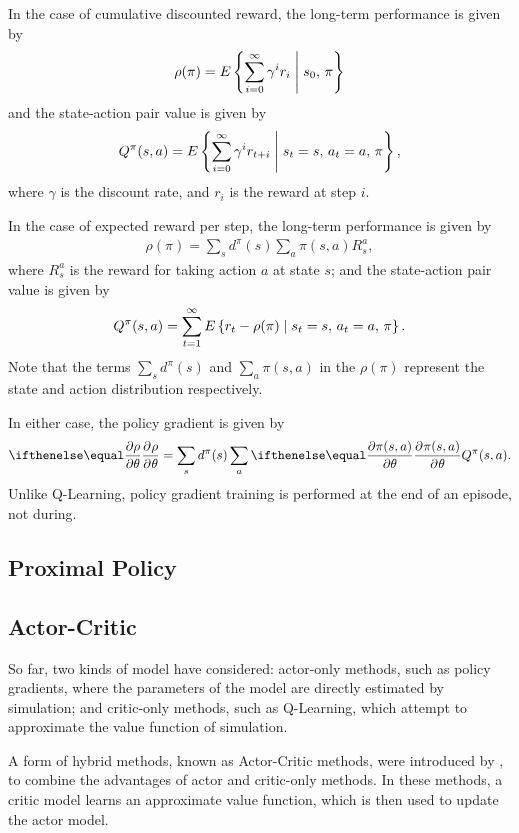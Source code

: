 In the case of cumulative discounted reward, the long-term performance is given
by
\begin{align*}
    \rho(\pi) = E\left\{ \sum_{i=0}^{\infty} \gamma^{i}r_{i}
    \;\middle|\; s_0,\, \pi \right\}
\end{align*}
and the state-action pair value is given by
\begin{align*}
    Q^\pi(s,a) = E\left\{ \sum_{i=0}^{\infty} \gamma^{i}r_{t+i}
    \;\middle|\; s_t=s,\, a_t=a,\, \pi \right\},
\end{align*}
where $\gamma$ is the discount rate, and $r_i$ is the reward at step $i$.

In the case of expected reward per step, the long-term performance is given by
\begin{align*}
    \rho(\pi) = \sum_s d^\pi(s) \sum_a \pi(s,a) R_s^a,
\end{align*}
where $R_s^a$ is the reward for taking action $a$ at state $s$;
and the state-action pair value is given by
\begin{align*}
    Q^\pi(s,a) = \sum_{t=1}^{\infty} E\left\{ r_t - \rho(\pi)
    \;\middle|\; s_t=s,\, a_t=a,\, \pi \right\}.
\end{align*}
Note that the terms $\sum_s d^\pi(s)$ and $\sum_a \pi(s,a)$ in the $\rho(\pi)$
represent the state and action distribution respectively.

In either case, the policy gradient is given by
\begin{align*}
    \Rpdiff{\rho}{\theta} = \sum_s d^\pi(s) \sum_a \Rpdiff{\pi(s,a)}{\theta} Q^\pi(s,a).
\end{align*}
Unlike Q-Learning, policy gradient training is performed at the end of an
episode, not during.



\subsection{Proximal Policy}

\cite{Schulman:2017:Proximal}

\subsection{Actor-Critic}

So far, two kinds of model have considered:
actor-only methods, such as policy gradients, where the parameters of the model
are directly estimated by simulation;
and critic-only methods, such as Q-Learning, which attempt to approximate the
value function of simulation.

A form of hybrid methods, known as Actor-Critic methods, were introduced by
\cite{Konda:2000:Actor}, to combine the advantages of actor and critic-only
methods.
In these methods, a critic model learns an approximate value function, which is
then used to update the actor model.










